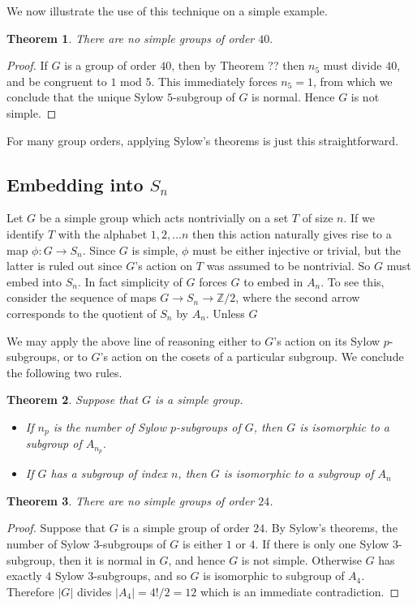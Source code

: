 \documentclass[11pt, oneside]{article}   	%
\newtheorem{theorem}{Theorem}
\begin{document}
We now illustrate the use of this technique on a simple example.

\begin{theorem}
There are no simple groups of order $40.$
\end{theorem}

\begin{proof}
If $G$ is a group of order $40$, then by Theorem ?? then $n_5$ must divide $40$, and be congruent to $1$ mod $5$.  This immediately forces $n_5 = 1$, from which we conclude that the unique Sylow $5$-subgroup of $G$ is normal.  Hence $G$ is not simple.
\end{proof}

For many group orders, applying Sylow's theorems is just this straightforward.


\subsection{Embedding into $S_n$}

Let $G$ be a simple group which acts nontrivially on a set $T$ of size $n.$  If we identify $T$ with the alphabet $1,2,\ldots n$ then this action naturally gives rise to a map $\phi: G \rightarrow S_n.$  Since $G$ is simple, $\phi$ must be either injective or trivial, but the latter is ruled out since $G$'s action on $T$ was assumed to be nontrivial.  So $G$ must embed into $S_n$.  In fact simplicity of $G$ forces $G$ to embed in $A_n$.  To see this, consider the sequence of maps $G\rightarrow S_n \rightarrow \mathbb{Z}/2$, where the second arrow corresponds to the quotient of $S_n$ by $A_n.$  Unless $G$ 

We may apply the above line of reasoning either to $G$'s action on its Sylow $p$-subgroups, or to $G$'s action on the cosets of a particular subgroup.  We conclude the following two rules.
\begin{theorem}
Suppose that $G$ is a simple group.
\begin{itemize}
\item If $n_p$ is the number of Sylow $p$-subgroups of $G$, then $G$ is isomorphic to a subgroup of $A_{n_p}.$
\item If $G$ has a subgroup of index $n$, then $G$ is isomorphic to a subgroup of $A_n$
\end{itemize}
\end{theorem}

\begin{theorem}
There are no simple groups of order $24$.
\end{theorem}
\begin{proof}
Suppose that $G$ is a simple group of order $24$.  By Sylow's theorems, the number of Sylow $3$-subgroups of $G$ is either $1$ or $4$.  If there is only one Sylow $3$-subgroup, then it is normal in $G$, and hence $G$ is not simple.  Otherwise $G$ has exactly $4$ Sylow $3$-subgroups, and so $G$ is isomorphic to subgroup of $A_4$.  Therefore $|G|$ divides $|A_4| = 4!/2 = 12$ which is an immediate contradiction.
\end{proof}
\end{document}
